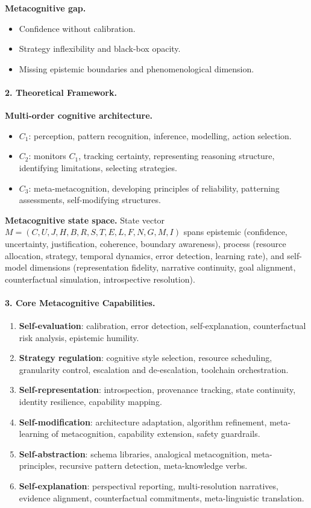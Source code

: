 \documentclass[12pt]{article}
\begin{document}
\textbf{Metacognitive gap.}
\begin{itemize}
\item Confidence without calibration.
\item Strategy inflexibility and black-box opacity.
\item Missing epistemic boundaries and phenomenological dimension.
\end{itemize}

\paragraph{2. Theoretical Framework.}
\textbf{Multi-order cognitive architecture.}
\begin{itemize}
\item $C_1$: perception, pattern recognition, inference, modelling, action selection.
\item $C_2$: monitors $C_1$, tracking certainty, representing reasoning structure, identifying limitations, selecting strategies.
\item $C_3$: meta-metacognition, developing principles of reliability, patterning assessments, self-modifying structures.
\end{itemize}

\textbf{Metacognitive state space.} State vector $M = (C,U,J,H,B,R,S,T,E,L,F,N,G,M,I)$ spans epistemic (confidence, uncertainty, justification, coherence, boundary awareness), process (resource allocation, strategy, temporal dynamics, error detection, learning rate), and self-model dimensions (representation fidelity, narrative continuity, goal alignment, counterfactual simulation, introspective resolution).

\paragraph{3. Core Metacognitive Capabilities.}
\begin{enumerate}
\item \textbf{Self-evaluation}: calibration, error detection, self-explanation, counterfactual risk analysis, epistemic humility.
\item \textbf{Strategy regulation}: cognitive style selection, resource scheduling, granularity control, escalation and de-escalation, toolchain orchestration.
\item \textbf{Self-representation}: introspection, provenance tracking, state continuity, identity resilience, capability mapping.
\item \textbf{Self-modification}: architecture adaptation, algorithm refinement, meta-learning of metacognition, capability extension, safety guardrails.
\item \textbf{Self-abstraction}: schema libraries, analogical metacognition, meta-principles, recursive pattern detection, meta-knowledge verbs.
\item \textbf{Self-explanation}: perspectival reporting, multi-resolution narratives, evidence alignment, counterfactual commitments, meta-linguistic translation.
\end{enumerate}
\end{document}
